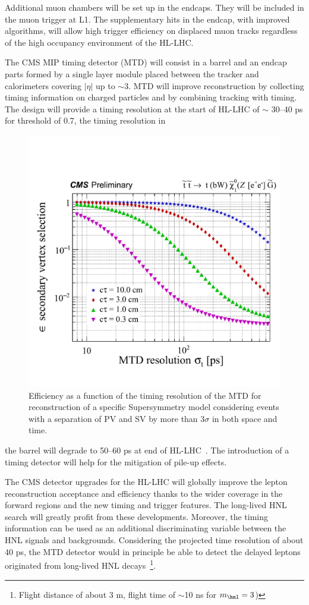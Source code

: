 Additional muon chambers will be set up in the endcaps. They will be included in
the muon trigger at L1. The supplementary hits in the
endcap, with improved algorithms, will allow high trigger efficiency 
on displaced muon tracks regardless of the high occupancy environment of the HL-LHC.
 
The CMS MIP timing detector (MTD) will
consist in a barrel and an endcap parts formed by a single layer
module placed between the tracker
and calorimeters covering $|\eta|$ up to $\sim$3.
MTD will improve reconstruction by collecting timing information on
charged particles and by combining tracking with timing. The design will provide a timing resolution
at the start of HL-LHC of $\sim$ 30--40 ps for \pt threshold of
0.7\GeV, the timing resolution in
 \begin{figure}
\centering
    \includegraphics[clip,trim=0.5cm 1cm 0.cm 3cm, width=.45\textwidth]{Figures/c7/MDT.pdf}
\caption{ 
Efficiency as a function of the timing
resolution of the MTD for reconstruction of a specific Supersymmetry
model considering events with a separation of
PV and SV by more than 3$\sigma$ in both space and time\cite{Alimena_2020}.}
\label{fig:MDT_alimena}
\end{figure}
 the barrel will degrade to 50--60 ps
at end of
 HL-LHC~\cite{Marta}. The introduction of a timing detector will help for
the mitigation of pile-up effects.

The CMS detector upgrades for the HL-LHC will globally improve the lepton
reconstruction acceptance
and efficiency thanks to the wider coverage in the forward regions and
 the new timing
and trigger features. The long-lived HNL search will greatly profit
from these developments. Moreover, the timing information can be used
as an additional discriminating variable between the HNL signals and
backgrounds. Considering the projected time resolution of about 40 ps,
the MTD detector would in principle be able to detect the delayed
leptons originated from long-lived HNL decays~\footnote{Flight
  distance of about 3 m, flight time of $\sim$10 ns
for $m_\hnl = 3$\GeV)}.\\

